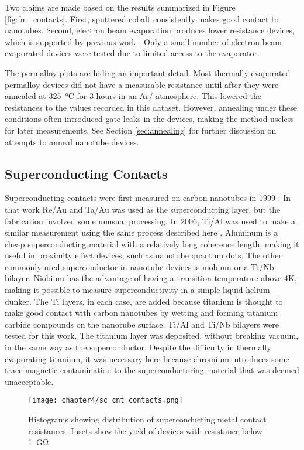 Two claims are made based on the results summarized in Figure \ref{fig:fm_contacts}. First, sputtered cobalt consistently makes good contact to nanotubes. Second, electron beam evaporation produces lower resistance devices, which is supported by previous work \cite{Churchill2012}. Only a small number of electron beam evaporated devices were tested due to limited access to the evaporator.

The permalloy plots are hiding an important detail. Most thermally evaporated permalloy devices did not have a measurable resistance until after they were annealed at \SI{325}{\celsius} for 3 hours in an Ar/ atmosphere. This lowered the resistances to the values recorded in this dataset. However, annealing under these conditions often introduced gate leaks in the devices, making the method useless for later measurements. See Section \ref{sec:annealing} for further discussion on attempts to anneal nanotube devices.

\subsection{Superconducting Contacts}

Superconducting contacts were first measured on carbon nanotubes in 1999 \cite{Kasumov1999}. In that work Re/Au and Ta/Au was used as the superconducting layer, but the fabrication involved some unusual processing. In 2006, Ti/Al was used to make a similar measurement using the same process described here \cite{JarilloHerrero2006}. Aluminum is a cheap superconducting material with a relatively long coherence length, making it useful in proximity effect devices, such as nanotube quantum dots. The other commonly used superconductor in nanotube devices is niobium or a Ti/Nb bilayer. Niobium has the advantage of having a transition temperature above 4K, making it possible to measure superconductivity in a simple liquid helium dunker. The Ti layers, in each case, are added because titanium is thought to make good contact with carbon nanotubes by wetting and forming titanium carbide compounds on the nanotube surface. Ti/Al and Ti/Nb bilayers were tested for this work. The titanium layer was deposited, without breaking vacuum, in the same way as the superconductor. Despite the difficulty in thermally evaporating titanium, it was necessary here because chromium introduces some trace magnetic contamination to the superconductoring material that was deemed unacceptable.

\begin{figure}
    \centering
    \texttt{[image: chapter4/sc\_cnt\_contacts.png]}
    \caption{Histograms showing distribution of superconducting metal contact resistances. Insets show the yield of devices with resistance below \SI{1}{\giga\ohm}}
    \label{fig:sc_contacts}
\end{figure}

